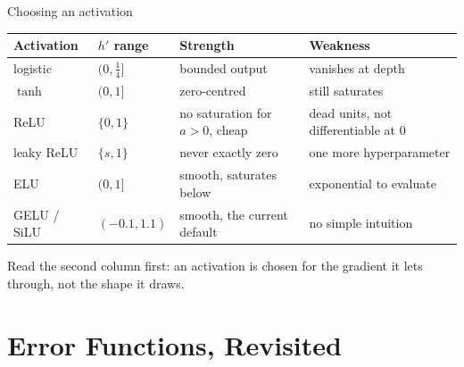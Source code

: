 \documentclass[aspectratio=169, 11pt]{beamer}
\newcommand{\nosrc}{}       %
\begin{document}
\begin{frame}{Choosing an activation}
  \nosrc
  \vspace{0.05em}
  \centering
  \renewcommand{\arraystretch}{1.25}
  {\footnotesize
  \begin{tabular}{p{} p{}
                  p{} p{}}
    \textbf{Activation} & \textbf{$h'$ range} & \textbf{Strength}
      & \textbf{Weakness}\\
    \hline
    logistic & $(0,\tfrac14]$ & bounded output
      & vanishes at depth\\
    $\tanh$ & $(0,1]$ & zero-centred
      & still saturates\\
    ReLU & $\{0,1\}$ & no saturation for $a>0$, cheap
      & dead units, not differentiable at $0$\\
    leaky ReLU & $\{s,1\}$ & never exactly zero
      & one more hyperparameter\\
    ELU & $(0,1]$ & smooth, saturates below
      & exponential to evaluate\\
    GELU / SiLU & $(-0.1,1.1)$ & smooth, the current default
      & no simple intuition\\
    \hline
  \end{tabular}}
  \vspace{0.05em}
  {\small Read the second column first: an activation is chosen for the
  \alert{gradient it lets through}, not the shape it draws.}
\end{frame}

\section{Error Functions, Revisited}
\end{document}
